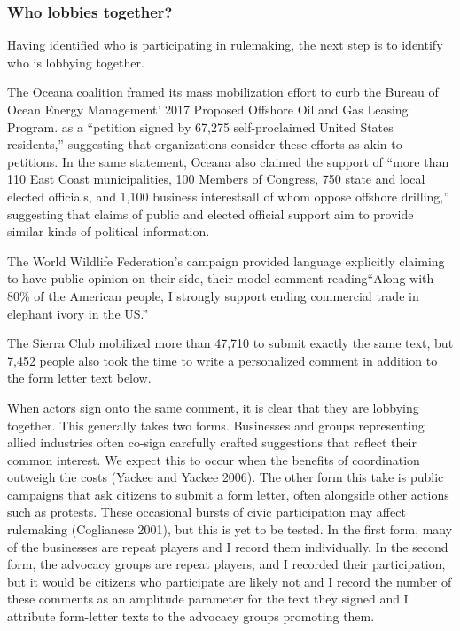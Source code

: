 \subsubsection{Who lobbies together?}

Having identified who is participating in rulemaking, the next step is to identify who is lobbying together.


The Oceana coalition framed its mass mobilization effort to curb the  Bureau of Ocean Energy Management’ 2017 Proposed Offshore Oil and Gas Leasing Program. as a ``petition signed by 67,275 self-proclaimed United States residents,'' suggesting that organizations consider these efforts as akin to petitions. In the same statement, Oceana also claimed the support of ``more than 110 East Coast municipalities, 100 Members of Congress, 750 state and local elected officials, and 1,100 business interestsall of whom oppose offshore drilling,'' suggesting that claims of public and elected official support aim to provide similar kinds of political information. 

The World Wildlife Federation's campaign provided language explicitly claiming to have public opinion on their side, their model comment reading``Along with 80\% of the American people, I strongly support ending commercial trade in elephant ivory in the US.''


The Sierra Club mobilized more than 47,710 to submit exactly the same text, but 7,452 people also took the time to write a personalized comment in addition to the form letter text below.

When actors sign onto the same comment, it is clear that they are lobbying together. This generally takes two forms. Businesses and groups representing allied industries often co-sign carefully crafted suggestions that reflect their common interest. We expect this to occur when the benefits of coordination outweigh the costs (Yackee and Yackee 2006). The other form this take is public campaigns that ask citizens to submit a form letter, often alongside other actions such as protests. These occasional bursts of civic participation may affect rulemaking (Coglianese 2001), but this is yet to be tested. In the first form, many of the businesses are repeat players and I record them individually. In the second form, the advocacy groups are repeat players, and I recorded their participation, but it would be citizens who participate are likely not and I record the number of these comments as an amplitude parameter for the text they signed and I attribute form-letter texts to the advocacy groups promoting them.


